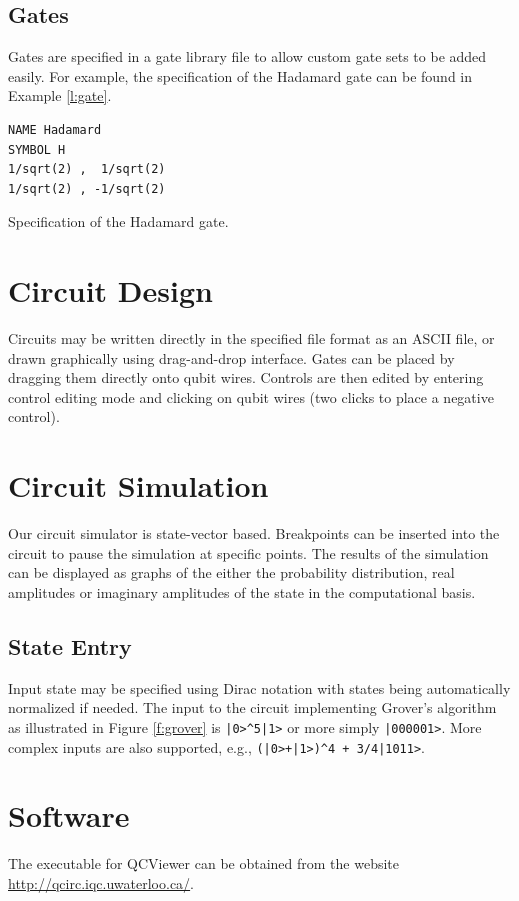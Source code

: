 \documentclass[aps,prl,reprint,floatfix,superscriptaddress]{revtex4-1} %
\begin{document}
\subsection{Gates}\label{sub:gates}
Gates are specified in a gate library file to allow custom gate sets to be added easily.
For example, the specification of the Hadamard gate can be found in Example \ref{l:gate}.
\begin{program}
\begin{verbatim}
NAME Hadamard
SYMBOL H
1/sqrt(2) ,  1/sqrt(2)
1/sqrt(2) , -1/sqrt(2)
\end{verbatim}
\caption{Specification of the Hadamard gate.}
\label{l:gate}
\end{program}
\section{Circuit Design}
Circuits may be written directly in the specified file format as an ASCII file, or drawn graphically using drag-and-drop interface.  
Gates can be placed by dragging them directly onto qubit wires.
Controls are then edited by entering control editing mode and clicking on qubit wires (two clicks to place a negative control).
\section{Circuit Simulation}
Our circuit simulator is state-vector based.
Breakpoints can be inserted into the circuit to pause the simulation at specific points.
The results of the simulation can be displayed as graphs of the either the probability distribution, real amplitudes or imaginary amplitudes of the state in the computational basis.
\subsection{State Entry}
Input state may be specified using Dirac notation with states being automatically normalized if needed.
The input to the circuit implementing Grover's algorithm as illustrated in Figure \ref{f:grover} is \verb$|0>^5|1>$ or more simply \verb$|000001>$. 
More complex inputs are also supported, e.g., \verb$(|0>+|1>)^4 + 3/4|1011>$.

\section{Software}
The executable for QCViewer can be obtained from the website \url{http://qcirc.iqc.uwaterloo.ca/}.


\end{document}
